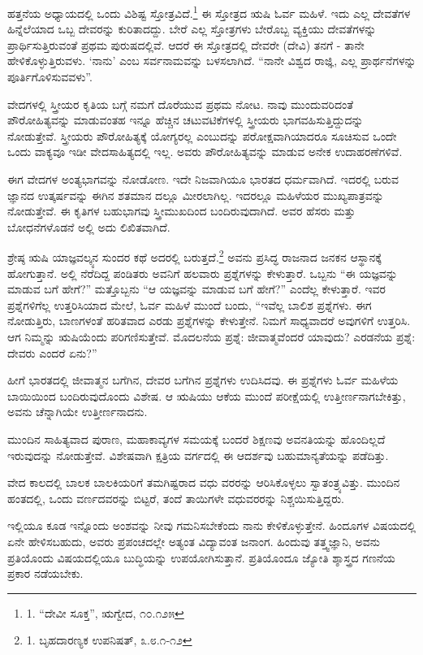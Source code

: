 ಹತ್ತನೆಯ ಅಧ್ಯಾಯದಲ್ಲಿ ಒಂದು ವಿಶಿಷ್ಟ ಸ್ತೋತ್ರವಿದೆ.\footnote{1. “ದೇವೀ ಸೂಕ್ತ”, ಋಗ್ವೇದ, ೧೦.೧೨೫} ಈ ಸ್ತೋತ್ರದ ಋಷಿ ಓರ್ವ ಮಹಿಳೆ. ಇದು ಎಲ್ಲ ದೇವತೆಗಳ ಹಿನ್ನೆಲೆಯಾದ ಒಬ್ಬ ದೇವರನ್ನು ಕುರಿತಾದದ್ದು. ಬೇರೆ ಎಲ್ಲ ಸ್ತೋತ್ರಗಳು ಬೇರೊಬ್ಬ ವ್ಯಕ್ತಿಯು ದೇವತೆಗಳನ್ನು ಪ್ರಾರ್ಥಿಸುತ್ತಿರುವಂತೆ ಪ್ರಥಮ ಪುರುಷದಲ್ಲಿವೆ. ಆದರೆ ಈ ಸ್ತೋತ್ರದಲ್ಲಿ ದೇವರೇ (ದೇವಿ) ತನಗೆ - ತಾನೇ ಹೇಳಿಕೊಳ್ಳುತ್ತಿರುವಳು. ‘ನಾನು’ ಎಂಬ ಸರ್ವನಾಮವನ್ನು ಬಳಸಲಾಗಿದೆ. “ನಾನೇ ವಿಶ್ವದ ರಾಜ್ಞಿ, ಎಲ್ಲ ಪ್ರಾರ್ಥನೆಗಳನ್ನು ಪೂರ್ತಿಗೊಳಿಸುವವಳು”.

ವೇದಗಳಲ್ಲಿ ಸ್ತ್ರೀಯರ ಕೃತಿಯ ಬಗ್ಗೆ ನಮಗೆ ದೊರೆಯುವ ಪ್ರಥಮ ನೋಟ. ನಾವು ಮುಂದುವರಿದಂತೆ ಪೌರೋಹಿತ್ಯವನ್ನು ಮಾಡುವಂತಹ ಇನ್ನೂ ಹೆಚ್ಚಿನ ಚಟುವಟಿಕೆಗಳಲ್ಲಿ ಸ್ತ್ರೀಯರು ಭಾಗವಹಿಸುತ್ತಿದ್ದುದನ್ನು ನೋಡುತ್ತೇವೆ. ಸ್ತ್ರೀಯರು ಪೌರೋಹಿತ್ಯಕ್ಕೆ ಯೋಗ್ಯರಲ್ಲ ಎಂಬುದನ್ನು ಪರೋಕ್ಷವಾಗಿಯಾದರೂ ಸೂಚಿಸುವ ಒಂದೇ ಒಂದು ವಾಕ್ಯವೂ ಇಡೀ ವೇದಸಾಹಿತ್ಯದಲ್ಲಿ ಇಲ್ಲ. ಅವರು ಪೌರೋಹಿತ್ಯವನ್ನು ಮಾಡುವ ಅನೇಕ ಉದಾಹರಣೆಗಳಿವೆ.

ಈಗ ವೇದಗಳ ಅಂತ್ಯಭಾಗವನ್ನು ನೋಡೋಣ. ಇದೇ ನಿಜವಾಗಿಯೂ ಭಾರತದ ಧರ್ಮವಾಗಿದೆ. ಇದರಲ್ಲಿ ಬರುವ ಜ್ಞಾನದ ಉತ್ಕರ್ಷವನ್ನು ಈಗಿನ ಶತಮಾನ ದಲ್ಲೂ ಮೀರಲಾಗಿಲ್ಲ. ಇದರಲ್ಲೂ ಮಹಿಳೆಯರ ಮುಖ್ಯಪಾತ್ರವನ್ನು ನೋಡುತ್ತೇವೆ. ಈ ಕೃತಿಗಳ ಬಹುಭಾಗವು ಸ್ತ್ರೀಮುಖದಿಂದ ಬಂದಿರುವುದಾಗಿದೆ. ಅವರ ಹೆಸರು ಮತ್ತು ಬೋಧನೆಗಳೊಡನೆ ಅಲ್ಲಿ ಅದು ಲಿಖಿತವಾಗಿದೆ.

ಶ್ರೇಷ್ಠ ಋಷಿ ಯಾಜ್ಞವಲ್ಕ್ಯನ ಸುಂದರ ಕಥೆ ಅದರಲ್ಲಿ ಬರುತ್ತದೆ.\footnote{1. ಬೃಹದಾರಣ್ಯಕ ಉಪನಿಷತ್, ೩.೮.೧-೧೨} ಅವನು ಪ್ರಸಿದ್ಧ ರಾಜನಾದ ಜನಕನ ಆಸ್ಥಾನಕ್ಕೆ ಹೋಗುತ್ತಾನೆ. ಅಲ್ಲಿ ನೆರೆದಿದ್ದ ಪಂಡಿತರು ಅವನಿಗೆ ಹಲವಾರು ಪ್ರಶ್ನೆಗಳನ್ನು ಕೇಳುತ್ತಾರೆ. ಒಬ್ಬನು “ಈ ಯಜ್ಞವನ್ನು ಮಾಡುವ ಬಗೆ ಹೇಗೆ?” ಮತ್ತೊಬ್ಬನು “ಆ ಯಜ್ಞವನ್ನು ಮಾಡುವ ಬಗೆ ಹೇಗೆ?” ಎಂದೆಲ್ಲ ಕೇಳುತ್ತಾರೆ. ಇವರ ಪ್ರಶ್ನೆಗಳಿಗೆಲ್ಲ ಉತ್ತರಿಸಿಯಾದ ಮೇಲೆ, ಓರ್ವ ಮಹಿಳೆ ಮುಂದೆ ಬಂದು, “ಇವೆಲ್ಲ ಬಾಲಿಶ ಪ್ರಶ್ನೆಗಳು. ಈಗ ನೋಡುತ್ತಿರು, ಬಾಣಗಳಂತೆ ಹರಿತವಾದ ಎರಡು ಪ್ರಶ್ನೆಗಳನ್ನು ಕೇಳುತ್ತೇನೆ. ನಿಮಗೆ ಸಾಧ್ಯವಾದರೆ ಅವುಗಳಿಗೆ ಉತ್ತರಿಸಿ. ಆಗ ನಿಮ್ಮನ್ನು ಋಷಿಯೆಂದು ಪರಿಗಣಿಸುತ್ತೇವೆ. ಮೊದಲನೆಯ ಪ್ರಶ್ನೆ: ಜೀವಾತ್ಮವೆಂದರೆ ಯಾವುದು? ಎರಡನೆಯ ಪ್ರಶ್ನೆ: ದೇವರು ಎಂದರೆ ಏನು?”

ಹೀಗೆ ಭಾರತದಲ್ಲಿ ಜೀವಾತ್ಮನ ಬಗೆಗಿನ, ದೇವರ ಬಗೆಗಿನ ಪ್ರಶ್ನೆಗಳು ಉದಿಸಿದವು. ಈ ಪ್ರಶ್ನೆಗಳು ಓರ್ವ ಮಹಿಳೆಯ ಬಾಯಿಯಿಂದ ಬಂದಿರುವುದೊಂದು ವಿಶೇಷ. ಆ ಋಷಿಯು ಆಕೆಯ ಮುಂದೆ ಪರೀಕ್ಷೆಯಲ್ಲಿ ಉತ್ತೀರ್ಣನಾಗಬೇಕಿತ್ತು, ಅವನು ಚೆನ್ನಾಗಿಯೇ ಉತ್ತೀರ್ಣನಾದನು.

ಮುಂದಿನ ಸಾಹಿತ್ಯವಾದ ಪುರಾಣ, ಮಹಾಕಾವ್ಯಗಳ ಸಮಯಕ್ಕೆ ಬಂದರೆ ಶಿಕ್ಷಣವು ಅವನತಿಯನ್ನು ಹೊಂದಿಲ್ಲದೆ ಇರುವುದನ್ನು ನೋಡುತ್ತೇವೆ. ವಿಶೇಷವಾಗಿ ಕ್ಷತ್ರಿಯ ವರ್ಗದಲ್ಲಿ ಈ ಆದರ್ಶವು ಬಹುಮಾನ್ಯತೆಯನ್ನು ಪಡೆದಿತ್ತು.

ವೇದ ಕಾಲದಲ್ಲಿ ಬಾಲಕ ಬಾಲಕಿಯರಿಗೆ ತಮಗಿಷ್ಟರಾದ ವಧು ವರರನ್ನು ಆರಿಸಿಕೊಳ್ಳಲು ಸ್ವಾತಂತ್ರ್ಯವಿತ್ತು. ಮುಂದಿನ ಹಂತದಲ್ಲಿ, ಒಂದು ವರ್ಣದವರನ್ನು ಬಿಟ್ಟರೆ, ತಂದೆ ತಾಯಿಗಳೇ ವಧುವರರನ್ನು ನಿಶ್ಚಯಿಸುತ್ತಿದ್ದರು.

ಇಲ್ಲಿಯೂ ಕೂಡ ಇನ್ನೊಂದು ಅಂಶವನ್ನು ನೀವು ಗಮನಿಸಬೇಕೆಂದು ನಾನು ಕೇಳಿಕೊಳ್ಳುತ್ತೇನೆ. ಹಿಂದೂಗಳ ವಿಷಯದಲ್ಲಿ ಏನೇ ಹೇಳಿಸಬಹುದು, ಅವರು ಪ್ರಪಂಚದಲ್ಲೇ ಅತ್ಯಂತ ವಿದ್ಯಾವಂತ ಜನಾಂಗ. ಹಿಂದುವು ತತ್ತ್ವಜ್ಞಾನಿ, ಅವನು ಪ್ರತಿಯೊಂದು ವಿಷಯದಲ್ಲಿಯೂ ಬುದ್ಧಿಯನ್ನು ಉಪಯೋಗಿಸುತ್ತಾನೆ. ಪ್ರತಿಯೊಂದೂ ಜ್ಯೋತಿ ಶ್ಶಾಸ್ತ್ರದ ಗಣನೆಯ ಪ್ರಕಾರ ನಡೆಯಬೇಕು.

